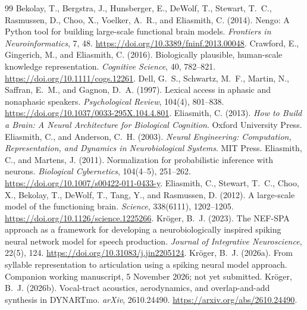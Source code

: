 \begin{thebibliography}{99}
Bekolay, T., Bergstra, J., Hunsberger, E., DeWolf, T., Stewart, T.~C., Rasmussen, D., Choo, X., Voelker, A.~R., and Eliasmith, C. (2014).
Nengo: A Python tool for building large-scale functional brain models.
\textit{Frontiers in Neuroinformatics}, 7, 48.
\url{https://doi.org/10.3389/fninf.2013.00048}.
Crawford, E., Gingerich, M., and Eliasmith, C. (2016).
Biologically plausible, human-scale knowledge representation.
\textit{Cognitive Science}, 40, 782--821.
\url{https://doi.org/10.1111/cogs.12261}.
Dell, G.~S., Schwartz, M.~F., Martin, N., Saffran, E.~M., and Gagnon, D.~A. (1997).
Lexical access in aphasic and nonaphasic speakers.
\textit{Psychological Review}, 104(4), 801--838.
\url{https://doi.org/10.1037/0033-295X.104.4.801}.
Eliasmith, C. (2013).
\textit{How to Build a Brain: A Neural Architecture for Biological Cognition}.
Oxford University Press.
Eliasmith, C., and Anderson, C.~H. (2003).
\textit{Neural Engineering: Computation, Representation, and Dynamics in Neurobiological Systems}.
MIT Press.
Eliasmith, C., and Martens, J. (2011).
Normalization for probabilistic inference with neurons.
\textit{Biological Cybernetics}, 104(4--5), 251--262.
\url{https://doi.org/10.1007/s00422-011-0433-y}.
Eliasmith, C., Stewart, T.~C., Choo, X., Bekolay, T., DeWolf, T., Tang, Y., and Rasmussen, D. (2012).
A large-scale model of the functioning brain.
\textit{Science}, 338(6111), 1202--1205.
\url{https://doi.org/10.1126/science.1225266}.
Kröger, B.~J. (2023).
The NEF-SPA approach as a framework for developing a neurobiologically inspired spiking neural network model for speech production.
\textit{Journal of Integrative Neuroscience}, 22(5), 124.
\url{https://doi.org/10.31083/j.jin2205124}.
Kröger, B.~J. (2026a).
From syllable representation to articulation using a spiking neural model approach.
Companion working manuscript, 5 November 2026; not yet submitted.
Kröger, B.~J. (2026b).
Vocal-tract acoustics, aerodynamics, and overlap-and-add synthesis in DYNARTmo.
\textit{arXiv}, 2610.24490.
\url{https://arxiv.org/abs/2610.24490}.

\end{thebibliography}

